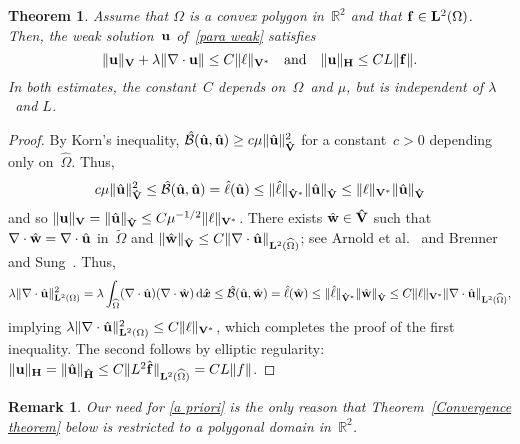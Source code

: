 \documentclass[11pt]{article}
\newcommand{\calBhat}{\hat{\mathcal{B}}}
\newcommand{\vf}{{\bf f}}
\newcommand{\vu}{{\bf u}}
\newcommand{\vV}{{\bf V}}
\newcommand{\vH}{{\bf H}}
\newcommand{\vVhat}{\mathbf{\hat V}}
\newcommand{\vHhat}{\mathbf{\hat H}}
\newcommand{\vw}{{\bf w}}
\newcommand{\bsx}{{\boldsymbol{x}}}
\numberwithin{equation}{section}
\newcommand{\ud}{\mathrm{d}}
\newtheorem{theorem}{Theorem}[section]
\newtheorem{remark}{Remark}[section]
\begin{document}
\begin{theorem}\label{lem: vu bound}
Assume that $\Omega$ is a convex polygon in~$\mathbb{R}^2$ and that
$\vf\in\mathbf{L}^2(\Omega)$. Then, the weak solution~$\vu$ of~\eqref{para weak}
satisfies
\begin{equation}\label{a priori}
\|\vu\|_{\vV}+\lambda\|\nabla\cdot\vu\|\le C\|\ell\|_{\vV^*}
\quad\text{and}\quad
\|\vu\|_{\vH}\le CL\|\vf\|.
\end{equation}
In both estimates, the constant~$C$ depends on~$\Omega$~and $\mu$, but is
independent of $\lambda$~and $L$.
\end{theorem}
\begin{proof}
By Korn's inequality, $\calBhat(\hat\vu,\hat\vu)\ge c\mu\|\hat\vu\|_{\vVhat}^2$
for a constant~$c>0$ depending only on~$\widehat\Omega$.  Thus,
\[
c\mu\|\hat\vu\|_{\vVhat}^2\le\calBhat(\hat\vu,\hat\vu)=\hat\ell(\hat\vu)
    \le\|\hat\ell\|_{\vVhat^*}\|\hat\vu\|_{\vVhat}
    \le\|\ell\|_{\vV^*}\|\hat\vu\|_{\vVhat}
\]
and so $\|\vu\|_{\vV}=\|\hat\vu\|_{\vVhat}\le C\mu^{-1/2}\|\ell\|_{\vV^*}$.
There exists $\hat\vw\in\vVhat$ such that
$\nabla\cdot\hat\vw=\nabla\cdot\hat\vu$ in~$\widetilde\Omega$ and
$\|\hat\vw\|_{\vVhat}
\le C\|\nabla\cdot\hat\vu\|_{\mathbf{L}^2(\widehat\Omega)}$; see Arnold et
al.~\cite[Theorem~3.1]{ArnoldEtAl1988} and Brenner and
Sung~\cite[Lemma~2.1]{BrennerSung1992}.  Thus,
\[
\lambda\|\nabla\cdot\hat\vu\|_{\mathbf{L}^2(\Omega)}^2
=\lambda\int_{\widehat\Omega}
    (\nabla\cdot\hat\vu)(\nabla\cdot\hat\vw)\,\ud\hat\bsx
\le\calBhat(\hat\vu,\hat\vw)=\hat\ell(\hat\vw)
\le\|\hat\ell\|_{\vVhat^*}\|\hat\vw\|_{\vVhat}
\le C\|\ell\|_{\vV^*}\|\nabla\cdot\hat\vu\|_{\mathbf{L}^2(\widehat\Omega)},
\]
implying $\lambda\|\nabla\cdot\hat\vu\|_{\mathbf{L}^2(\Omega)}^2
\le C\|\ell\|_{\vV^*}$, which completes the proof of the first
inequality.  The second follows by elliptic regularity:
$\|\vu\|_{\vH}=\|\hat\vu\|_{\vHhat}
\le C\|L^2\hat\vf\|_{\mathbf{L}^2(\widehat\Omega)}=CL\|f\|$.
\end{proof}

\begin{remark}
Our need for \eqref{a priori}  is the only reason that
Theorem~\ref{Convergence theorem} below is restricted to a polygonal domain
in~$\mathbb{R}^2$.
\end{remark}
\end{document}
